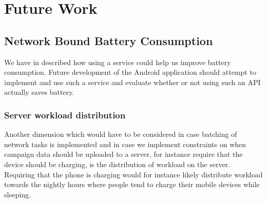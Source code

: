 
\chapter{Future Work}


\section{Network Bound Battery Consumption}
\label{sec:future_work_network_bound_battery_consumption}

We have in  described how using a  service could help us improve battery consumption. Future development of the Android application should attempt to implement and use such a service and evaluate whether or not using such an API actually saves battery.

\subsection{Server workload distribution}

Another dimension which would have to be considered in case batching of network tasks is implemented and in case we implement constraints on when campaign data should be uploaded to a server, for instance require that the device should be charging, is the distribution of workload on the server. Requiring that the phone is charging would for instance likely distribute workload towards the nightly hours where people tend to charge their mobile devices while sleeping.  

